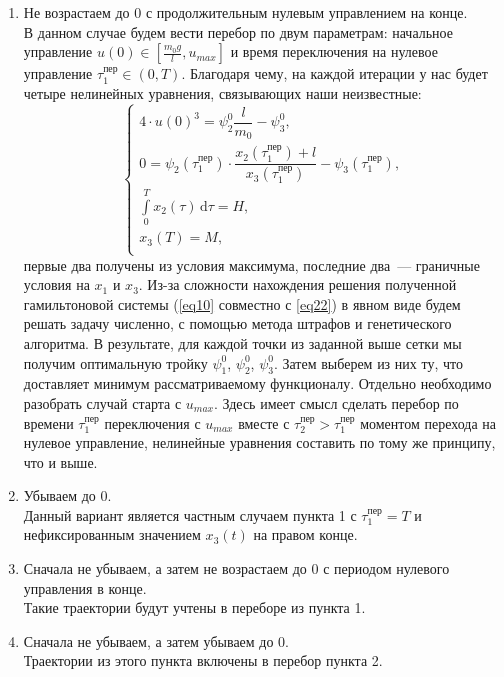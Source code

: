 \documentclass[a4paper,12pt]{article}
\begin{document}
\begin{itemize}
\begin{enumerate}
\item Не возрастаем до 0 с продолжительным нулевым управлением на конце. \\
В данном случае
 будем вести перебор по двум параметрам: начальное управление $u(0) \in [\frac{m_0 g}{l}, u_{max}]$ и время переключения на нулевое управление $\tau_1^{\text{пер}} \in (0, T)$. Благодаря чему, на каждой итерации у нас будет четыре нелинейных уравнения, связывающих наши неизвестные: 
\hypertarget{p28}{}
\begin{equation} \label{eq28}
\begin{cases} 
4 \cdot u(0)^3 = \psi_2^0 \dfrac{l}{m_0} - \psi_3^0, \\
0 = \psi_2(\tau_1^{\text{пер}}) \cdot \dfrac{x_2( \tau_1^{\text{пер}}) + l}{x_3(\tau_1^{\text{пер}})} - \psi_3(\tau_1^{\text{пер}}),  \\ 
 \int\limits_0^{T}{x_2(\tau)} \, \mathrm{d}\tau = H, \\
 x_3(T) = M, \\ 
\end{cases} 
\end{equation}
первые два получены из условия максимума, последние два~--- граничные условия на $x_1$ и $x_3$. Из-за сложности нахождения решения полученной гамильтоновой системы (\eqref{eq10} совместно с \eqref{eq22}) в явном виде будем решать задачу численно, с помощью метода штрафов и генетического алгоритма. В результате, для каждой точки из заданной выше сетки мы получим оптимальную тройку $\psi_1^0$, $\psi_2^0$, $\psi_3^0$. Затем выберем из них ту, что доставляет минимум рассматриваемому функционалу. Отдельно необходимо разобрать случай старта с $u_{max}$. Здесь имеет смысл сделать перебор по времени $\tau_1^{\text{пер}}$  переключения с $u_{max}$ вместе с $\tau_2^{\text{пер}} > \tau_1^{\text{пер}} $ моментом перехода на нулевое управление, нелинейные уравнения составить по тому же принципу, что и выше.
 
\item Убываем до 0. \\
Данный вариант является частным случаем пункта 1 с $\tau_1^{\text{пер}} = T$ и нефиксированным значением $x_3(t)$ на правом конце.
\item Сначала не убываем, а затем не возрастаем до 0 с периодом нулевого управления в конце. \\
Такие траектории будут учтены в переборе из пункта 1.

\item Сначала не убываем, а затем убываем до 0. \\
Траектории из этого пункта включены в перебор пункта 2.


\end{enumerate}
\end{itemize}
\end{document}
